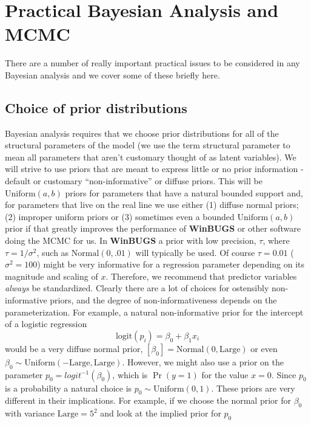 \section{Practical Bayesian Analysis and MCMC}

There are a number of really important practical issues to be
considered in any Bayesian analysis and we cover some of these briefly
here.

\subsection{Choice of prior distributions}

Bayesian analysis requires that we choose prior
distributions for all of the structural parameters of the model (we
use the term structural parameter to mean all parameters that aren't
customary thought of as latent variables). We will strive to use
priors that are meant to express little or no prior information -
default or customary ``non-informative'' or diffuse priors. This will
be $\mbox{Uniform}(a,b)$ priors for parameters that have a natural
bounded support and, for parameters that live on the real line we use
either (1) diffuse normal priors; (2) improper uniform priors or
(3) sometimes even a bounded $\mbox{Uniform}(a,b)$ prior if that greatly
improves the performance of {\bf WinBUGS} or other software doing the MCMC
for us.  In {\bf WinBUGS} a prior with low precision, $\tau$, where
$\tau = 1/\sigma^2$, such as $\mbox{Normal}(0,.01)$ will typically be
used. Of course $\tau = 0.01$ ($\sigma^{2} = 100$) might be very
informative for a regression parameter depending on its magnitude and
scaling of $x$.
 Therefore, we recommend that predictor variables {\it
  always} be standardized. Clearly there are a lot of choices for
ostensibly non-informative priors, and the degree of
non-informativeness depends on the parameterization. For example, a
natural non-informative prior for the intercept of a logistic
regression
\[
\mbox{logit}(p_{i}) = \beta_0 + \beta_1 x_{i}
\]
would be a very diffuse normal prior,
$[\beta_0] = \mbox{Normal}(0,\mbox{Large})$ or even
 $\beta_0 \sim
\mbox{Uniform}(-\mbox{Large},\mbox{Large})$.
However, we might also use a prior on the parameter $p_0
= logit^{-1}(\beta_0)$, which is $\Pr(y=1)$ for the value $x=0$. 
Since $p_0$ is a
probability a natural choice is $p_0 \sim \mbox{Uniform}(0,1)$. 
These priors are very different in their implications. For example, if
we choose the normal prior for $\beta_0$ with variance
$\mbox{Large} = 5^2$ and look at the implied prior for $p_{0}$
